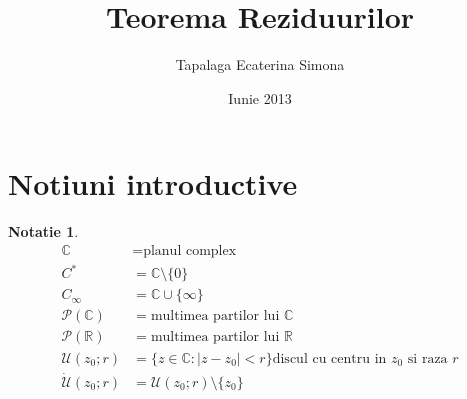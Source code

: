 \documentclass[12pt,a4paper]{article}
\newtheorem{notation}{Notatie}
\begin{document}
\title{Teorema Reziduurilor}
\author{Tapalaga Ecaterina Simona}
\date{Iunie 2013}
\maketitle


\section{Notiuni introductive}

\begin{notation}

\begin{equation}
	\begin{aligned}
		\mathbb C &= \text{planul complex}\\
		C^* &= \mathbb{C}\setminus \{0\} \\
		C_\infty &= \mathbb{C}\cup \{\infty\} \\
		\mathcal{P}(\mathbb{C}) &= \text{multimea partilor lui } \mathbb{C} \\
		\mathcal{P}(\mathbb{R}) &= \text{multimea partilor lui } \mathbb{R} \\
		\mathcal{U}(z_0;r) &= \{z \in \mathbb{C} \colon |z - z_0| < r \} \text{discul cu centru in } z_0 \text{ si raza } r \\
		\dot{\mathcal{U}}(z_0;r) &= \mathcal{U}(z_0;r) \setminus \{z_0\}
	\end{aligned}
\end{equation}

		
\end{notation}
\end{document}
